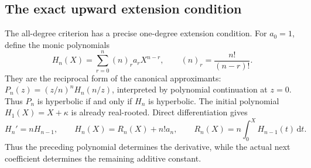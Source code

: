 \documentclass[11pt,a4paper]{article}
\numberwithin{equation}{section}
\theoremstyle{definition}
\theoremstyle{remark}
\newcommand{\dd}{\,\mathrm d}
\begin{document}
\subsection{The exact upward extension condition}
\label{can-app-subsec:extension}

The all-degree criterion has a precise one-degree extension condition.
For $a_0=1$, define the monic polynomials
\begin{equation}\label{can-app-eq:definition}
 H_n(X)=\sum_{r=0}^n(n)_r a_rX^{n-r},
 \qquad (n)_r=\frac{n!}{(n-r)!}.
\end{equation}
They are the reciprocal form of the canonical approximants:
$P_n(z)=(z/n)^nH_n(n/z)$, interpreted by polynomial continuation
at $z=0$. Thus $P_n$ is hyperbolic if and only if $H_n$ is
hyperbolic. The initial polynomial $H_1(X)=X+\kappa$ is already
real-rooted.
Direct differentiation gives
\begin{equation}\label{can-app-eq:derivative}
 H_n'=nH_{n-1},\qquad
 H_n(X)=R_n(X)+n!a_n,\qquad
 R_n(X)=n\int_0^X H_{n-1}(t)\dd t.
\end{equation}
Thus the preceding polynomial determines the derivative, while the
actual next coefficient determines the remaining additive constant.
\end{document}
